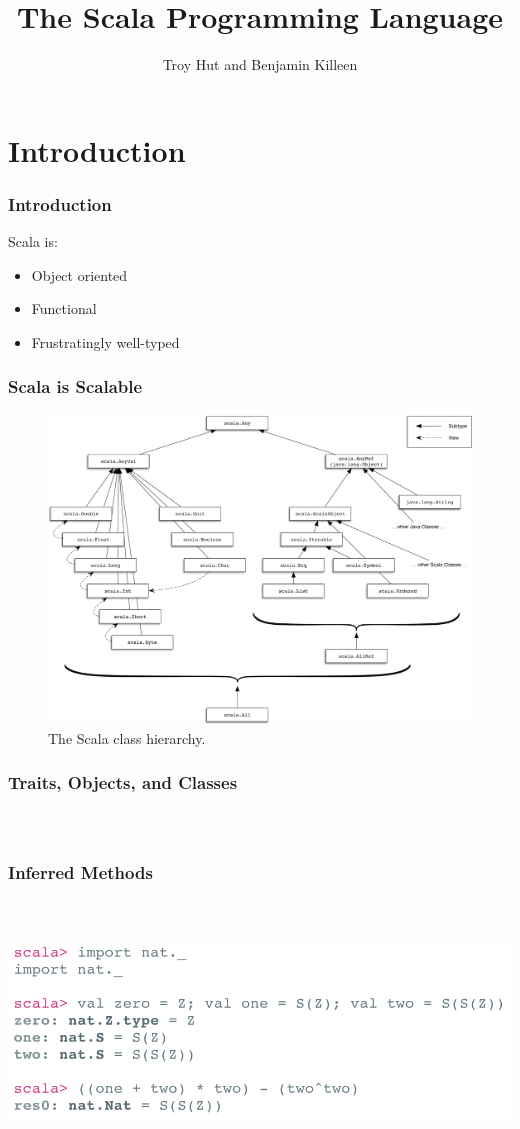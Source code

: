 \documentclass[10pt, usenames, dvipsnames, table]{beamer}
\title{The Scala Programming Language}
\author{Troy Hut and Benjamin Killeen}
\date{}
\begin{document}
\begin{frame}
  \titlepage{}
\end{frame}

\section{Introduction}
\begin{frame}
  \frametitle{Introduction}
  Scala is:
  \begin{itemize}
  \item<2-> Object oriented
  \item<3-> Functional
  \item<4-> Frustratingly well-typed
  \end{itemize}
\end{frame}

\begin{frame}
  \frametitle{Scala is \textbf{Scalable}}
  \begin{figure}
    \centering
    \includegraphics[width=0.8\linewidth]{scala_classes}
    \caption{The Scala class hierarchy.}
    \label{fig:class_hierarchy}
  \end{figure}
\end{frame}

\begin{frame}
  \frametitle{Traits, Objects, and Classes}
  \inputminted{Scala}{../examples/ExampleNat.scala}
  \pause{}
  \inputminted{Scala}{../examples/ExampleZero.scala}
  \pause{}
  \inputminted{Scala}{../examples/ExampleSucc.scala}  
\end{frame}

\begin{frame}
  \frametitle{Inferred Methods}
  \inputminted[firstline=1, lastline=1, fontsize=\tiny]
  {Scala}{../examples/Nat.scala}
  \inputminted[firstline=5, lastline=12, fontsize=\tiny]
  {Scala}{../examples/Nat.scala}
  \inputminted[firstline=19, lastline=19, fontsize=\tiny]
  {Scala}{../examples/Nat.scala}
  \pause{}
  \includegraphics[width=0.7\linewidth]{nat_usage}
\end{frame}
\end{document}
